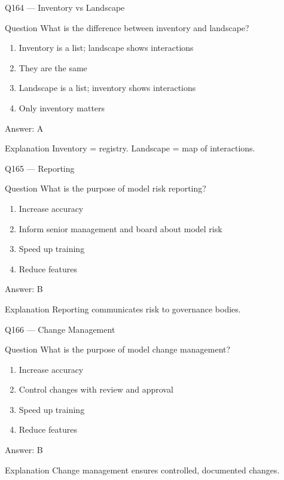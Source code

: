 \documentclass[aspectratio=169,8pt]{beamer}
\begin{document}
	\begin{frame}{Q164 --- Inventory vs Landscape}
		\begin{block}{Question}
			What is the difference between inventory and landscape?
		\end{block}
		\begin{enumerate}
			\item Inventory is a list; landscape shows interactions
			\item They are the same
			\item Landscape is a list; inventory shows interactions
			\item Only inventory matters
		\end{enumerate}
		\begin{exampleblock}{Answer: A}\end{exampleblock}
		\begin{block}{Explanation}
			Inventory = registry. Landscape = map of interactions.
		\end{block}
	\end{frame}
	
	\begin{frame}{Q165 --- Reporting}
		\begin{block}{Question}
			What is the purpose of model risk reporting?
		\end{block}
		\begin{enumerate}
			\item Increase accuracy
			\item Inform senior management and board about model risk
			\item Speed up training
			\item Reduce features
		\end{enumerate}
		\begin{exampleblock}{Answer: B}\end{exampleblock}
		\begin{block}{Explanation}
			Reporting communicates risk to governance bodies.
		\end{block}
	\end{frame}
	
	\begin{frame}{Q166 --- Change Management}
		\begin{block}{Question}
			What is the purpose of model change management?
		\end{block}
		\begin{enumerate}
			\item Increase accuracy
			\item Control changes with review and approval
			\item Speed up training
			\item Reduce features
		\end{enumerate}
		\begin{exampleblock}{Answer: B}\end{exampleblock}
		\begin{block}{Explanation}
			Change management ensures controlled, documented changes.
		\end{block}
	\end{frame}
	
\end{document}
